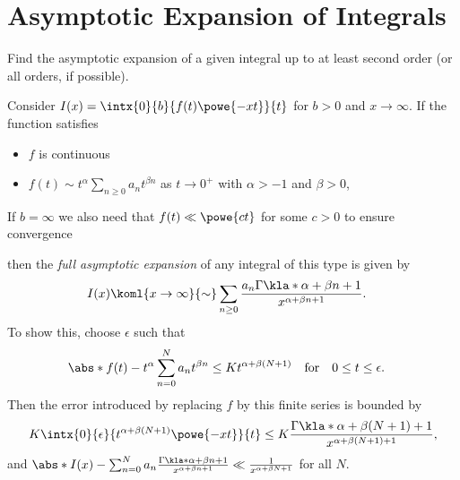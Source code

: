 \documentclass[english, parskip=full]{scrartcl}
\newcommand{\definition}[2]{\begin{tcolorbox}[colback=colorbackgrounddefinition,colframe=colordefinition, breakable,enhanced,title=\textbf{#1}.]#2\end{tcolorbox}}
\newcommand{\note}[1]{\begin{tcolorbox}[colback=colorbackgroundnote,colframe=colornote, breakable,enhanced]#1\end{tcolorbox}}
\begin{document}
\section{Asymptotic Expansion of Integrals}
Find the asymptotic expansion of a given integral up to at least second order (or all orders, if possible).
\definition{Watson's Lemma}{Consider $I(x) = \intx{0}{b}{f(t) \powe{-xt}}{t}$ for $b>0$ and $x\rightarrow \infty$.
If the function satisfies
\begin{itemize}
\item $f$ is continuous
\item $f(t) \sim t^\alpha \sum_{n\ge 0} a_n t^{\beta n}$ as $t\rightarrow 0^+$ with $\alpha > -1$ and $\beta > 0$,
\end{itemize}
\note{If $b=\infty$ we also need that $f(t)\ll \powe{ct}$ for some $c>0$ to ensure convergence}
then the \emph{full asymptotic expansion} of any integral of this type is given by
\begin{align}
I(x) &\koml{x\rightarrow\infty}{\sim} \sum_{n\ge 0} \frac{a_n \Gamma\kla*{\alpha + \beta n+ 1}}{x^{\alpha + \beta n + 1}}.
\end{align}
To show this, choose $\epsilon$ such that
\begin{align}
\abs*{f(t) - t^\alpha \sum_{n=0}^N a_n t^{\beta n}} &\le K t^{\alpha + \beta (N+1)} \quad \text{for} \quad 0\le t \le \epsilon.
\end{align}
Then the error introduced by replacing $f$ by this finite series is bounded by
\begin{align}
K\intx{0}{\epsilon}{t^{\alpha + \beta (N+1)} \powe{-xt}}{t} \le K \frac{\Gamma\kla*{\alpha + \beta(N+1)+1}}{x^{\alpha + \beta(N+1)+1}},
\end{align}
and $\abs*{I(x) - \sum_{n=0}^N a_n \frac{\Gamma\kla*{\alpha + \beta n + 1}}{x^{\alpha + \beta n + 1}}} \ll \frac{1}{x^{\alpha + \beta N + 1}}$ for all $N$.
}
\end{document}
